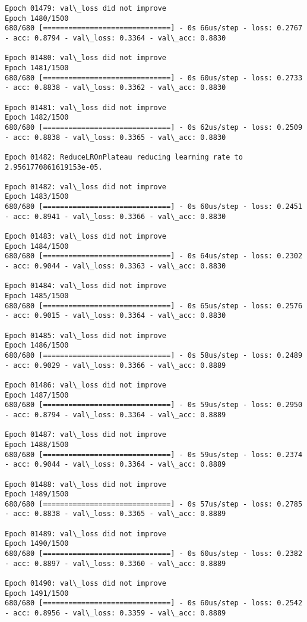 \documentclass[11pt]{article}
\begin{document}
\begin{Verbatim}[commandchars=\\\{\}]
Epoch 01479: val\_loss did not improve
Epoch 1480/1500
680/680 [==============================] - 0s 66us/step - loss: 0.2767 - acc: 0.8794 - val\_loss: 0.3364 - val\_acc: 0.8830

Epoch 01480: val\_loss did not improve
Epoch 1481/1500
680/680 [==============================] - 0s 60us/step - loss: 0.2733 - acc: 0.8838 - val\_loss: 0.3362 - val\_acc: 0.8830

Epoch 01481: val\_loss did not improve
Epoch 1482/1500
680/680 [==============================] - 0s 62us/step - loss: 0.2509 - acc: 0.8838 - val\_loss: 0.3365 - val\_acc: 0.8830

Epoch 01482: ReduceLROnPlateau reducing learning rate to 2.9561770861619153e-05.

Epoch 01482: val\_loss did not improve
Epoch 1483/1500
680/680 [==============================] - 0s 60us/step - loss: 0.2451 - acc: 0.8941 - val\_loss: 0.3366 - val\_acc: 0.8830

Epoch 01483: val\_loss did not improve
Epoch 1484/1500
680/680 [==============================] - 0s 64us/step - loss: 0.2302 - acc: 0.9044 - val\_loss: 0.3363 - val\_acc: 0.8830

Epoch 01484: val\_loss did not improve
Epoch 1485/1500
680/680 [==============================] - 0s 65us/step - loss: 0.2576 - acc: 0.9015 - val\_loss: 0.3364 - val\_acc: 0.8830

Epoch 01485: val\_loss did not improve
Epoch 1486/1500
680/680 [==============================] - 0s 58us/step - loss: 0.2489 - acc: 0.9029 - val\_loss: 0.3366 - val\_acc: 0.8889

Epoch 01486: val\_loss did not improve
Epoch 1487/1500
680/680 [==============================] - 0s 59us/step - loss: 0.2950 - acc: 0.8794 - val\_loss: 0.3364 - val\_acc: 0.8889

Epoch 01487: val\_loss did not improve
Epoch 1488/1500
680/680 [==============================] - 0s 59us/step - loss: 0.2374 - acc: 0.9044 - val\_loss: 0.3364 - val\_acc: 0.8889

Epoch 01488: val\_loss did not improve
Epoch 1489/1500
680/680 [==============================] - 0s 57us/step - loss: 0.2785 - acc: 0.8838 - val\_loss: 0.3365 - val\_acc: 0.8889

Epoch 01489: val\_loss did not improve
Epoch 1490/1500
680/680 [==============================] - 0s 60us/step - loss: 0.2382 - acc: 0.8897 - val\_loss: 0.3360 - val\_acc: 0.8889

Epoch 01490: val\_loss did not improve
Epoch 1491/1500
680/680 [==============================] - 0s 60us/step - loss: 0.2542 - acc: 0.8956 - val\_loss: 0.3359 - val\_acc: 0.8889


\end{Verbatim}
\end{document}
